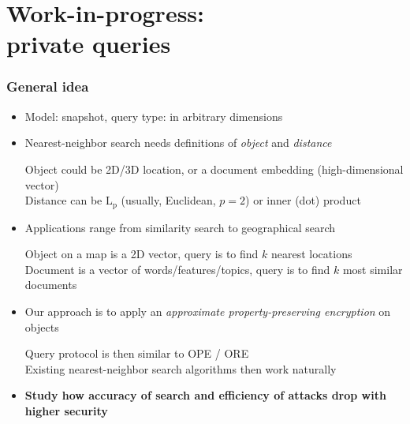 \section{Work-in-progress: \\ private \knn{} queries}

	\begin{frame}[label={frame:knn}]

		\frametitle{General idea}

		\begin{itemize}
			\item<1->
				Model: \alert{snapshot}, query type: \alert{\knn{}} in arbitrary dimensions

			\item<2->
				Nearest-neighbor search needs definitions of \emph{object} and \emph{distance} \\
				\begin{small}
					\indent{} Object could be 2D/3D location, or a document embedding (high-dimensional vector) \\
					\indent{} Distance can be $\text{L}_\text{p}$ (usually, Euclidean, $p = 2$) or inner (dot) product
				\end{small}

			\item<3->
				Applications range from similarity search to geographical search \\
				\begin{small}
					\indent{} Object on a map is a 2D vector, query is to find $k$ nearest locations \\
					\indent{} Document is a vector of words/features/topics, query is to find $k$ most similar documents
				\end{small}

			\item<4->
				Our approach is to apply an \emph{approximate property-preserving encryption} on objects \\
				\begin{small}
					\indent{} Query protocol is then similar to OPE / ORE \\
					\indent{} Existing nearest-neighbor search algorithms then work naturally
				\end{small}

			\item<5->
				\textbf{Study how accuracy of search and efficiency of attacks drop with higher security}

		\end{itemize}

	\end{frame}

